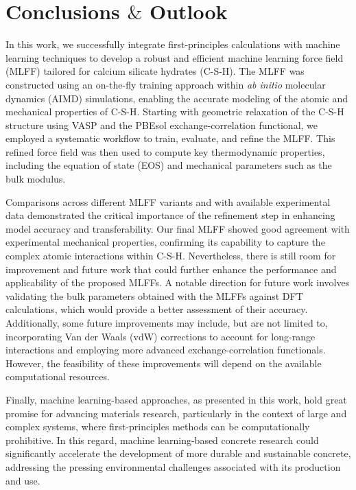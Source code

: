 \chapter{\texorpdfstring{Conclusions $\&$ Outlook}{Conclusions \& Outlook}} %

\label{Chapter5} %

In this work, we successfully integrate first-principles calculations with machine learning techniques to develop a robust and efficient machine learning force field (MLFF) tailored for calcium silicate hydrates (C-S-H). The MLFF was constructed using an on-the-fly training approach within \emph{ab initio} molecular dynamics (AIMD) simulations, enabling the accurate modeling of the atomic and mechanical properties of C-S-H. Starting with geometric relaxation of the C-S-H structure using VASP and the PBEsol exchange-correlation functional, we employed a systematic workflow to train, evaluate, and refine the MLFF. This refined force field was then used to compute key thermodynamic properties, including the equation of state (EOS) and mechanical parameters such as the bulk modulus.

Comparisons across different MLFF variants and with available experimental data demonstrated the critical importance of the refinement step in enhancing model accuracy and transferability.
Our final MLFF showed good agreement with experimental mechanical properties, confirming its capability to capture the complex atomic interactions within C-S-H. Nevertheless, there is still room for improvement and future work that could further enhance the performance and applicability of the proposed MLFFs. A notable direction for future work involves validating the bulk parameters obtained with the MLFFs against DFT calculations, which would provide a better assessment of their accuracy. Additionally, some future improvements may include, but are not limited to, incorporating Van der Waals (vdW) corrections to account for long-range interactions and employing more advanced exchange-correlation functionals. However, the feasibility of these improvements will depend on the available computational resources.

Finally, machine learning-based approaches, as presented in this work, hold great promise for advancing materials research, particularly in the context of large and complex systems, where first-principles methods can be computationally prohibitive. In this regard, machine learning-based concrete research could significantly accelerate the development of more durable and sustainable concrete, addressing the pressing environmental challenges associated with its production and use.
